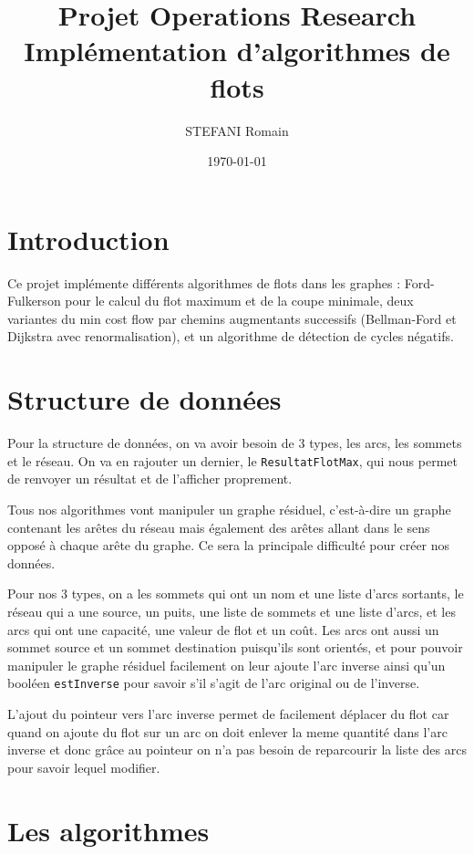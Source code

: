 \documentclass[11pt,a4paper]{article}
\title{Projet Operations Research \\ \large Implémentation d'algorithmes de flots}
\author{STEFANI Romain}
\date{\today}
\begin{document}
\maketitle

\section{Introduction}

Ce projet implémente différents algorithmes de flots dans les graphes : Ford-Fulkerson pour le calcul du flot maximum et de la coupe minimale, deux variantes du min cost flow par chemins augmentants successifs (Bellman-Ford et Dijkstra avec renormalisation), et un algorithme de détection de cycles négatifs.

\section{Structure de données}

Pour la structure de données, on va avoir besoin de 3 types, les arcs, les sommets et le réseau. On va en rajouter un dernier, le \texttt{ResultatFlotMax}, qui nous permet de renvoyer un résultat et de l'afficher proprement.

\medskip
Tous nos algorithmes vont manipuler un graphe résiduel, c'est-à-dire un graphe contenant les arêtes du réseau mais également des arêtes allant dans le sens opposé à chaque arête du graphe. Ce sera la principale difficulté pour créer nos données.

\medskip
Pour nos 3 types, on a les sommets qui ont un nom et une liste d'arcs sortants, le réseau qui a une source, un puits, une liste de sommets et une liste d'arcs, et les arcs qui ont une capacité, une valeur de flot et un coût. Les arcs ont aussi un sommet source et un sommet destination puisqu'ils sont orientés, et pour pouvoir manipuler le graphe résiduel facilement on leur ajoute l'arc inverse ainsi qu'un booléen \texttt{estInverse} pour savoir s'il s'agit de l'arc original ou de l'inverse.


L'ajout du pointeur vers l'arc inverse permet de facilement déplacer du flot car quand on ajoute du flot sur un arc on doit enlever la meme quantité dans l'arc inverse et donc grâce au pointeur on n'a pas besoin de reparcourir la liste des arcs pour savoir lequel modifier.


\section{Les algorithmes}
\end{document}
